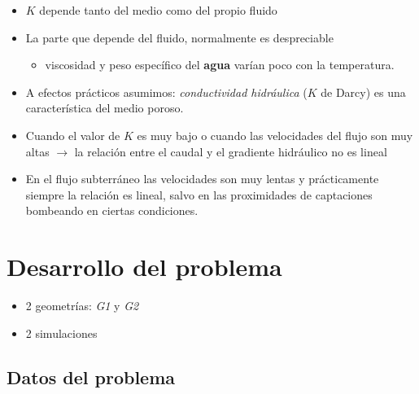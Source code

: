 \documentclass[spanish]{beamer}
\begin{document}
%
\begin{frame}
\begin{itemize}
\item $K$ depende tanto del medio como del propio fluido
\item La parte que depende del fluido, normalmente es despreciable
	\begin{itemize} 
		\item viscosidad y peso específico del \textbf{agua} varían poco con la temperatura.
	\end{itemize}
\item A efectos prácticos asumimos: \emph{conductividad hidráulica} ($K$ de Darcy) es una característica del medio poroso.
\item Cuando el valor de $K$ es muy bajo o cuando las velocidades del flujo son muy altas $\rightarrow$ la relación entre el caudal y el gradiente hidráulico no es lineal 
\item En el flujo subterráneo las velocidades son muy lentas y prácticamente siempre la relación es lineal, salvo en las proximidades de captaciones bombeando en ciertas condiciones.
\end{itemize}
\end{frame}
\section{Desarrollo del problema}
%
\begin{frame}
\begin{itemize}
\item 2 geometrías: \emph{G1} y \emph{G2}
\item 2 simulaciones
\end{itemize}
\end{frame}
%
\subsection{Datos del problema}
\end{document}
